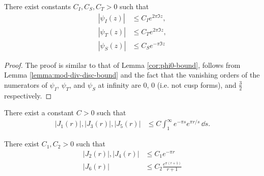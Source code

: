 \begin{lemma}\label{lemma:psi-bound}
    There exist constants $C_I, C_S, C_T > 0$ such that
    \begin{align}
        |\psi_I(z)| &\le C_I e^{2\pi \Im z}, \label{eqn:psiI-bound} \\
        |\psi_T(z)| &\le C_T e^{2\pi \Im z}, \label{eqn:psiT-bound} \\
        |\psi_S(z)| &\le C_S e^{- \pi \Im z} \label{eqn:psiS-bound}
    \end{align}
\end{lemma}
\begin{proof}
    The proof is similar to that of Lemma \ref{cor:phi0-bound}, follows from Lemma \ref{lemma:mod-div-disc-bound} and the fact that the vanishing orders of the numerators of $\psi_I$, $\psi_T$, and $\psi_S$ at infinity are $0$, $0$ (i.e. not cusp forms), and $\frac{3}{2}$ respectively.
\end{proof}

\begin{lemma}\label{lemma:bound-J1-J3-J5}
There exist a constant $C > 0$ such that
\begin{align}
    |J_1(r)|, |J_3(r)|, |J_5(r)| &\le C \int_1^{\infty} e^{-\pi s} e^{\pi r / s}\, \dd s.
\end{align}
\end{lemma}

\begin{lemma}\label{lemma:bound-J2-J4-J6}
    There exist $C_1, C_2 > 0$ such that
    \begin{align}
        |J_2(r)|, |J_4(r)| &\le C_1 e^{-\pi r} \\
        |J_6(r)| &\le C_2 \frac{e^{\pi (r + 1)}}{r + 1}
    \end{align}
\end{lemma}





